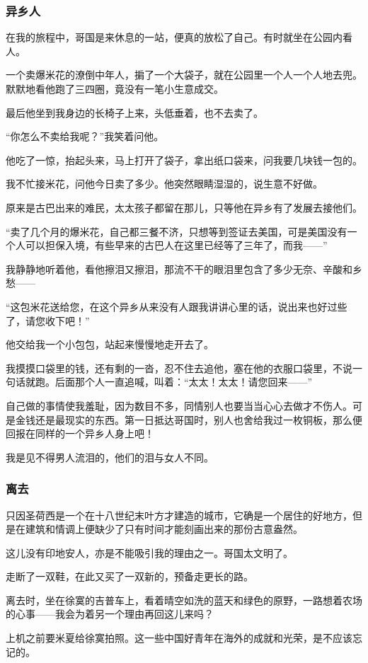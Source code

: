 \subsubsection*{异乡人}
\par 在我的旅程中，哥国是来休息的一站，便真的放松了自己。有时就坐在公园内看人。
\par 一个卖爆米花的潦倒中年人，掮了一个大袋子，就在公园里一个人一个人地去兜。默默地看他跑了三四圈，竟没有一笔小生意成交。
\par 最后他坐到我身边的长椅子上来，头低垂着，也不去卖了。
\par “你怎么不卖给我呢？”我笑着问他。
\par 他吃了一惊，抬起头来，马上打开了袋子，拿出纸口袋来，问我要几块钱一包的。
\par 我不忙接米花，问他今日卖了多少。他突然眼睛湿湿的，说生意不好做。
\par 原来是古巴出来的难民，太太孩子都留在那儿，只等他在异乡有了发展去接他们。
\par “卖了几个月的爆米花，自己都三餐不济，只想等到签证去美国，可是美国没有一个人可以担保入境，有些早来的古巴人在这里已经等了三年了，而我——”
\par 我静静地听着他，看他擦泪又擦泪，那流不干的眼泪里包含了多少无奈、辛酸和乡愁——
\par “这包米花送给您，在这个异乡从来没有人跟我讲讲心里的话，说出来也好过些了，请您收下吧！”
\par 他交给我一个小包包，站起来慢慢地走开去了。
\par 我摸摸口袋里的钱，还有剩的一沓，忍不住去追他，塞在他的衣服口袋里，不说一句话就跑。后面那个人一直追喊，叫着：“太太！太太！请您回来——”
\par 自己做的事情使我羞耻，因为数目不多，同情别人也要当当心心去做才不伤人。可是金钱还是最现实的东西。第一日抵达哥国时，别人也舍给我过一枚铜板，那么便回报在同样的一个异乡人身上吧！
\par 我是见不得男人流泪的，他们的泪与女人不同。
\subsubsection*{离去}
\par 只因圣荷西是一个在十八世纪末叶方才建造的城市，它确是一个居住的好地方，但是在建筑和情调上便缺少了只有时间才能刻画出来的那份古意盎然。
\par 这儿没有印地安人，亦是不能吸引我的理由之一。哥国太文明了。
\par 走断了一双鞋，在此又买了一双新的，预备走更长的路。
\par 离去时，坐在徐寞的吉普车上，看着晴空如洗的蓝天和绿色的原野，一路想着农场的心事——我会为着另一个理由再回这儿来吗？
\par 上机之前要米夏给徐寞拍照。这一些中国好青年在海外的成就和光荣，是不应该忘记的。



